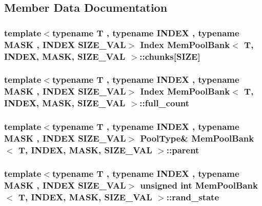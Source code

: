\subsection{Member Data Documentation}
\hypertarget{structMemPoolBank_a85a00715ded7421c4be8ca40ea015865}{
\subsubsection[{chunks}]{\setlength{\rightskip}{0pt plus 5cm}template$<$typename T , typename I\-N\-D\-E\-X , typename M\-A\-S\-K , I\-N\-D\-E\-X S\-I\-Z\-E\-\_\-\-V\-A\-L$>$ {\bf Index} {\bf Mem\-Pool\-Bank}$<$ T, I\-N\-D\-E\-X, M\-A\-S\-K, S\-I\-Z\-E\-\_\-\-V\-A\-L $>$\-::chunks\mbox{[}{\bf S\-I\-Z\-E}\mbox{]}}}\label{structMemPoolBank_a85a00715ded7421c4be8ca40ea015865}
\hypertarget{structMemPoolBank_ad34b898caec6f8150db61db5da563683}{
\subsubsection[{full\-\_\-count}]{\setlength{\rightskip}{0pt plus 5cm}template$<$typename T , typename I\-N\-D\-E\-X , typename M\-A\-S\-K , I\-N\-D\-E\-X S\-I\-Z\-E\-\_\-\-V\-A\-L$>$ {\bf Index} {\bf Mem\-Pool\-Bank}$<$ T, I\-N\-D\-E\-X, M\-A\-S\-K, S\-I\-Z\-E\-\_\-\-V\-A\-L $>$\-::full\-\_\-count}}\label{structMemPoolBank_ad34b898caec6f8150db61db5da563683}
\hypertarget{structMemPoolBank_a2333639e39620bbefb2148cf4cee3c4a}{
\subsubsection[{parent}]{\setlength{\rightskip}{0pt plus 5cm}template$<$typename T , typename I\-N\-D\-E\-X , typename M\-A\-S\-K , I\-N\-D\-E\-X S\-I\-Z\-E\-\_\-\-V\-A\-L$>$ {\bf Pool\-Type}\& {\bf Mem\-Pool\-Bank}$<$ T, I\-N\-D\-E\-X, M\-A\-S\-K, S\-I\-Z\-E\-\_\-\-V\-A\-L $>$\-::parent}}\label{structMemPoolBank_a2333639e39620bbefb2148cf4cee3c4a}
\hypertarget{structMemPoolBank_af9787855d48c00526151a602cb890f10}{
\subsubsection[{rand\-\_\-state}]{\setlength{\rightskip}{0pt plus 5cm}template$<$typename T , typename I\-N\-D\-E\-X , typename M\-A\-S\-K , I\-N\-D\-E\-X S\-I\-Z\-E\-\_\-\-V\-A\-L$>$ unsigned int {\bf Mem\-Pool\-Bank}$<$ T, I\-N\-D\-E\-X, M\-A\-S\-K, S\-I\-Z\-E\-\_\-\-V\-A\-L $>$\-::rand\-\_\-state}}\label{structMemPoolBank_af9787855d48c00526151a602cb890f10}
